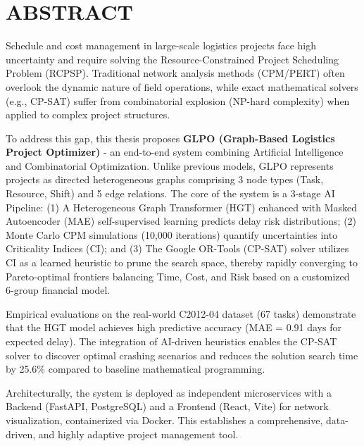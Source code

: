 \chapter*{ABSTRACT}

Schedule and cost management in large-scale logistics projects face high uncertainty and require solving the Resource-Constrained Project Scheduling Problem (RCPSP). Traditional network analysis methods (CPM/PERT) often overlook the dynamic nature of field operations, while exact mathematical solvers (e.g., CP-SAT) suffer from combinatorial explosion (NP-hard complexity) when applied to complex project structures.

To address this gap, this thesis proposes \textbf{GLPO (Graph-Based Logistics Project Optimizer)} - an end-to-end system combining Artificial Intelligence and Combinatorial Optimization. Unlike previous models, GLPO represents projects as directed heterogeneous graphs comprising 3 node types (Task, Resource, Shift) and 5 edge relations. The core of the system is a 3-stage AI Pipeline: (1) A Heterogeneous Graph Transformer (HGT) enhanced with Masked Autoencoder (MAE) self-supervised learning predicts delay risk distributions; (2) Monte Carlo CPM simulations (10,000 iterations) quantify uncertainties into Criticality Indices (CI); and (3) The Google OR-Tools (CP-SAT) solver utilizes CI as a learned heuristic to prune the search space, thereby rapidly converging to Pareto-optimal frontiers balancing Time, Cost, and Risk based on a customized 6-group financial model.

Empirical evaluations on the real-world C2012-04 dataset (67 tasks) demonstrate that the HGT model achieves high predictive accuracy (MAE = 0.91 days for expected delay). The integration of AI-driven heuristics enables the CP-SAT solver to discover optimal crashing scenarios and reduces the solution search time by 25.6\% compared to baseline mathematical programming.

Architecturally, the system is deployed as independent microservices with a Backend (FastAPI, PostgreSQL) and a Frontend (React, Vite) for network visualization, containerized via Docker. This establishes a comprehensive, data-driven, and highly adaptive project management tool.